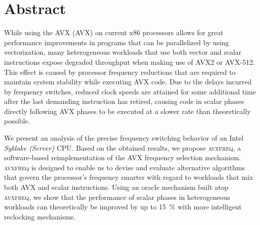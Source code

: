 \chapter{Abstract}
\label{sec:abstract}

While using the \acrlong{AVX} (\acrshort{AVX}) on current \gls{x86} processors allows for great performance improvements in programs that can be parallelized by using vectorization, many heterogeneous workloads that use both vector and scalar instructions expose degraded throughput when making use of \gls{AVX2} or \gls{AVX-512}. This effect is caused by processor frequency reductions that are required to maintain system stability while executing \acrshort{AVX} code. Due to the delays incurred by frequency switches, reduced clock speeds are attained for some additional time after the last demanding instruction has retired, causing code in scalar phases directly following \acrshort{AVX} phases to be executed at a slower rate than theoretically possible.

We present an analysis of the precise frequency switching behavior of an Intel \textit{Syklake (Server)} \gls{CPU}. Based on the obtained results, we propose \textsc{avxfreq}, a software-based reimplementation of the \acrshort{AVX} frequency selection mechanism. \textsc{avxfreq} is designed to enable us to devise and evaluate alternative algorithms that govern the processor's frequency smarter with regard to workloads that mix both \acrshort{AVX} and scalar instructions. Using an oracle mechanism built atop \textsc{avxfreq}, we show that the performance of scalar phases in heterogeneous workloads can theoretically be improved by up to \SI{15}{\percent} with more intelligent reclocking mechanisms.